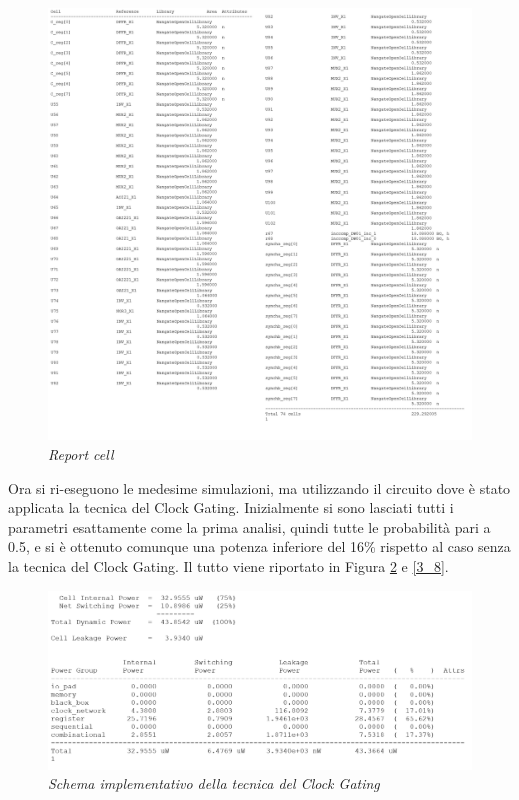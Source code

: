 \begin{figure}[!htb]
	\centering
	\includegraphics[scale=0.65]{immagini/3_6}
	\caption{\textit{Report cell}}
	\label{3_6}
\end{figure}
\newpage
Ora si ri-eseguono le medesime simulazioni, ma utilizzando il circuito dove è stato applicata la tecnica del Clock Gating. Inizialmente si sono lasciati tutti i parametri esattamente come la prima analisi, quindi tutte le probabilità pari a 0.5, e si è ottenuto comunque una potenza inferiore del 16\% rispetto al caso senza la tecnica del Clock Gating. Il tutto viene riportato in Figura \ref{3_7} e \ref{3_8}. \\
\begin{figure}[!htb]
	\centering
	\includegraphics[scale=0.65]{immagini/3_7}
	\caption{\textit{Schema implementativo della tecnica del Clock Gating}}
	\label{3_7}
\end{figure}

